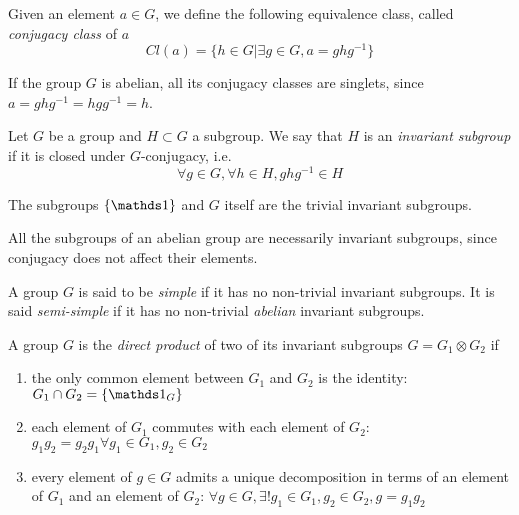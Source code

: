 \begin{definition}
    Given an element $a \in G$, we define the following equivalence class, called \emph{conjugacy class} of $a$
    \begin{equation*}
        Cl(a) = \{h \in G | \exists g \in G, a = g h g^{-1}\}
    \end{equation*}
\end{definition}
\begin{remark}
    If the group $G$ is abelian, all its conjugacy classes are singlets, since $a = ghg^{-1} = hgg^{-1} = h$.
\end{remark}

\begin{definition}
    Let $G$ be a group and $H \subset G$ a subgroup. We say that $H$ is an \emph{invariant subgroup} if it is closed under $G$-conjugacy, i.e.
    \begin{equation*}
        \forall g \in G, \forall h \in H, ghg^{-1} \in H
    \end{equation*}
\end{definition}
\begin{remark}
    The subgroups $\{\idop\}$ and $G$ itself are the trivial invariant subgroups.
\end{remark}
\begin{remark}
    All the subgroups of an abelian group are necessarily invariant subgroups, since conjugacy does not affect their elements.
\end{remark}

\begin{definition}
    A group $G$ is said to be \emph{simple} if it has no non-trivial invariant subgroups.
    It is said \emph{semi-simple} if it has no non-trivial \emph{abelian} invariant subgroups.
\end{definition}

\begin{definition}
    A group $G$ is the \emph{direct product} of two of its invariant subgroups $G = G_1 \otimes G_2$ if
    \begin{enumerate}
        \item the only common element between $G_1$ and $G_2$ is the identity: $G_1 \cap G_2 = \{\idop_G\}$
        \item each element of $G_1$ commutes with each element of $G_2$: $g_1 g_2 = g_2 g_1 \forall g_1 \in G_1, g_2 \in G_2$
        \item every element of $g \in G$ admits a unique decomposition in terms of an element of $G_1$ and an element of $G_2$: $\forall g \in G, \exists ! g_1 \in G_1, g_2 \in G_2, g = g_1 g_2$
    \end{enumerate}
\end{definition}

